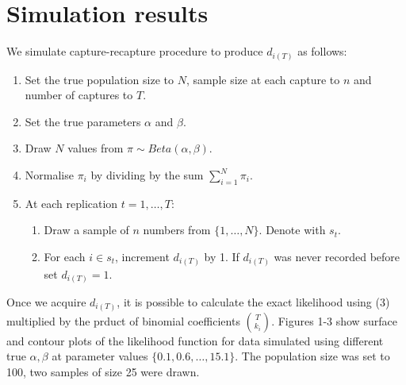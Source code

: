 \documentclass[a4paper, 12pt]{article}
\begin{document}
\section{Simulation results}
We simulate capture-recapture procedure to produce $d_{i(T)}$ as follows:
\begin{enumerate}
    \item Set the true population size to $N$, sample size at each capture to $n$ and number of captures to $T$.
    \item Set the true parameters $\alpha$ and $\beta$.
    \item Draw $N$ values from $\pi \sim Beta(\alpha, \beta)$.
    \item Normalise $\pi_i$ by dividing by the sum $\sum_{i=1}^{N} \pi_i$.
    \item At each replication $t = 1,\dots,T$:
        \begin{enumerate}
            \item Draw a sample of $n$ numbers from $\{1,\dots,N\}$. Denote with $s_t$.
            \item For each $i \in s_t$, increment $d_{i(T)}$ by 1. If $d_{i(T)}$ was never recorded before set $d_{i(T)} = 1$.
        \end{enumerate}
\end{enumerate}
Once we acquire $d_{i(T)}$, it is possible to calculate the exact likelihood using (3) multiplied by the prduct of binomial coefficients $\binom{T}{k_i}$. Figures 1-3 show surface and contour plots of the likelihood function for data simulated using different true $\alpha, \beta$ at parameter values $\{0.1, 0.6, \dots, 15.1\}$. The population size was set to 100, two samples of size 25 were drawn.
\end{document}
